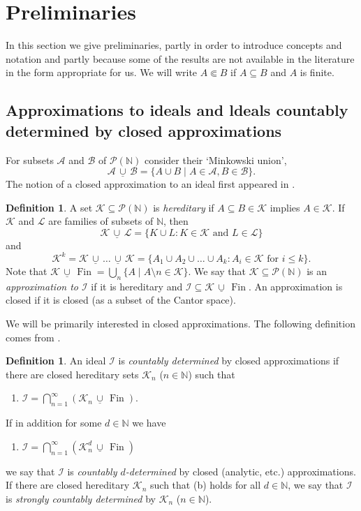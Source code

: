 \documentclass{amsart}
\def\p{{\mathcal P}}              %
\def\N{\mathbb N}                        %
\def\Fin{{\rm Fin}}   %
\def\I{{\mathcal I}} %
\def\text{\mbox}
\theoremstyle{definition}
\newtheorem{definition}[proposition]{Definition}
\theoremstyle{remark}
\newcommand{\ucup}{\,\underline{\cup}\,}
\def\Fin{\operatorname{Fin}}
\newcommand{\cK}{{\mathcal K}}
\newcommand{\cP}{\mathcal P}
\newcommand{\calL}{\mathcal L}
\newcommand{\bbN}{\mathbb N}
\newcommand{\cI}{{\mathcal I}} %
\newcommand{\cA}{\mathcal A}
\newcommand{\cB}{\mathcal B}
\newcommand{\cPN}{\cP(\bbN)}
\numberwithin{claim}{subsection}
\begin{document}
\section{Preliminaries}

In this section we give preliminaries, partly in order to introduce concepts and notation and partly because some of the results are not available in the literature in the form appropriate for us. 
We will write $A\Subset B$ if $A\subseteq B$ and $A$ is finite. 

\subsection{Approximations to ideals and ldeals countably determined by closed approximations}
\label{S.CountablyDetermined}


For subsets $\cA$ and $\cB$ of $\cPN$ consider their `Minkowski union', 
\[
\cA\ucup \cB=\{A\cup B\mid A\in \cA,B\in \cB \}. 
\]
The notion of a closed approximation to an ideal first appeared in \cite{Just:WAT}. 

\begin{definition}\label{Def.hereditary}	
	A set $\cK\subseteq \p(\N)$ is \emph{hereditary} if $A\subseteq B\in \cK$ implies $A\in \cK$.
	If $\cK$ and $ \calL$ are families of subsets of $\N$, then
	$$
	\cK\ucup  \calL=\{K\cup L: K\in \cK\text{ and } L\in  \calL\}
	$$
	and
	$$
	\cK^k=\cK\ucup \dots \ucup \cK=\{A_1\cup A_2\cup \dots \cup A_k: A_i\in \cK\text{ for $i\leq k$}\}.
	$$
	Note that $\cK\ucup \Fin=\bigcup_n \{A\mid A\setminus n\in \cK\}$. We say that $\cK\subseteq \cP(\bbN)$ is an \emph{approximation to $\cI$} if it is hereditary  and $\cI\subseteq \cK\ucup \Fin$. An approximation is closed if it is closed (as a subset of the Cantor space).  
\end{definition}


We will be primarily interested in closed approximations. 
The following definition comes from \cite{Fa:Luzin}. 





\begin{definition}  \label{D.ctbly.det}
	An ideal $\cI$ is \emph{countably determined} by closed  approximations
	if there are closed   hereditary
	sets $\cK_n$ ($n\in \N$) such that
	\begin{enumerate}
		\item [(a)] $
		\I=\bigcap_{n=1}^\infty (\cK_n\ucup \Fin).
		$
	\end{enumerate}
	If in addition for some  $d\in \N$  we have
	\begin{enumerate}
		\item [(b)] $
		\I=\bigcap_{n=1}^\infty (\cK_n^d\ucup \Fin)
		$
	\end{enumerate}
	we say that $\cI$ is \emph{countably $d$-determined} by closed (analytic, etc.)  approximations.
	If there are closed hereditary $\cK_n$ such that {\rm(b)} holds for all $d\in \N$,
	we say that $\cI$ is \emph{strongly countably determined}
	by $\cK_n$ ($n\in \N$).
\end{definition}
\end{document}
